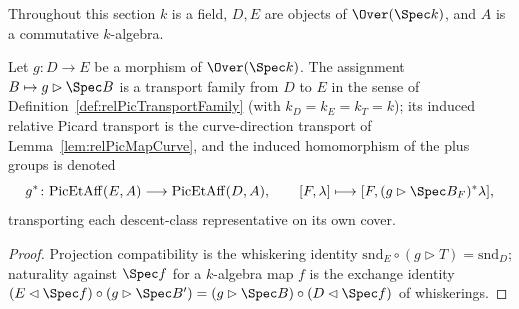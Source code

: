 Throughout this section \(k\) is a field, \(D, E\) are objects of \(\Over(\Spec k)\), and
\(A\) is a commutative \(k\)-algebra.

\begin{definition}
  \label{def:PicEtAff_curveMap}
  \leanok
  Let \(g \colon D \to E\) be a morphism of \(\Over(\Spec k)\). The assignment
  \(B \mapsto g \rhd \Spec B\) is a transport family from \(D\) to \(E\) in the sense of
  Definition~\ref{def:relPicTransportFamily} (with \(k_D = k_E = k_T = k\)); its induced
  relative Picard transport is the curve-direction transport of
  Lemma~\ref{lem:relPicMapCurve}, and the induced homomorphism of the plus groups is
  denoted
  \[
    g^{*} \colon \mathrm{PicEtAff}(E, A) \longrightarrow \mathrm{PicEtAff}(D, A),
    \qquad [F, \lambda] \longmapsto [F, (g \rhd \Spec B_F)^{*}\lambda],
  \]
  transporting each descent-class representative on its own cover.
\end{definition}
\begin{proof}
  \leanok
  Projection compatibility is the whiskering identity
  \(\mathrm{snd}_E \circ (g \rhd T) = \mathrm{snd}_D\); naturality against \(\Spec f\) for
  a \(k\)-algebra map \(f\) is the exchange identity
  \((E \lhd \Spec f) \circ (g \rhd \Spec B') = (g \rhd \Spec B) \circ (D \lhd \Spec f)\)
  of whiskerings.
\end{proof}

